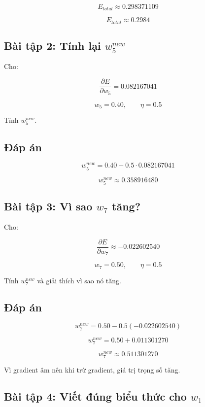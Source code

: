 \[
    E_{total}\approx 0.298371109
\]

\[
    E_{total}\approx 0.2984
\]

\subsection*{Bài tập 2: Tính lại $w_5^{new}$}

Cho:

\[
    \frac{\partial E}{\partial w_5}=0.082167041
\]

\[
    w_5=0.40,\qquad \eta=0.5
\]

Tính $w_5^{new}$.

\subsection*{Đáp án}

\[
    w_5^{new}
    =
    0.40
    -
    0.5\cdot 0.082167041
\]

\[
    w_5^{new}
    \approx 0.358916480
\]

\subsection*{Bài tập 3: Vì sao $w_7$ tăng?}

Cho:

\[
    \frac{\partial E}{\partial w_7}\approx -0.022602540
\]

\[
    w_7=0.50,\qquad \eta=0.5
\]

Tính $w_7^{new}$ và giải thích vì sao nó tăng.

\subsection*{Đáp án}

\[
    w_7^{new}
    =
    0.50
    -
    0.5(-0.022602540)
\]

\[
    w_7^{new}
    =
    0.50
    +
    0.011301270
\]

\[
    w_7^{new}
    \approx 0.511301270
\]

Vì gradient âm nên khi trừ gradient, giá trị trọng số tăng.

\subsection*{Bài tập 4: Viết đúng biểu thức cho $w_1$}

